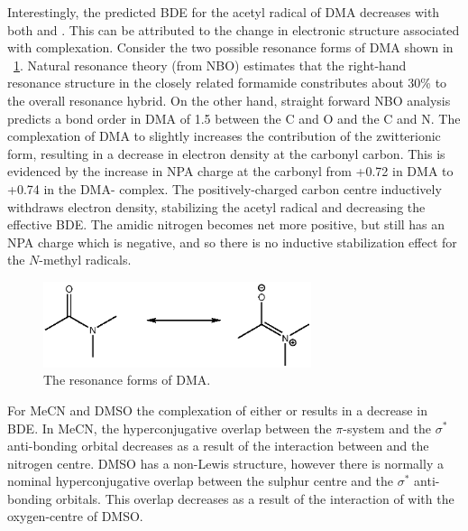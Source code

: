 Interestingly, the predicted BDE for the acetyl radical of DMA decreases with
both  and . This can be attributed to the change in
electronic structure associated with complexation. Consider the two possible
resonance forms of DMA shown in ~\ref{fig:dma-res}. Natural resonance theory
(from NBO) estimates that the right-hand resonance structure in the closely
related formamide constributes about 30\% to the overall resonance
hybrid.\cite{Hrabal1997} On the other hand, straight forward NBO analysis
predicts a bond order in DMA of 1.5 between the C and O and the C and N. The
complexation of DMA to  slightly increases the contribution of the
zwitterionic form, resulting in a decrease in electron density at the carbonyl
carbon. This is evidenced by the increase in NPA charge at the carbonyl from
+0.72 in DMA to +0.74 in the DMA- complex. The positively-charged
carbon centre inductively withdraws electron density, stabilizing the acetyl
radical and decreasing the effective BDE. The amidic nitrogen becomes net more
positive, but still has an NPA charge which is negative, and so there is no
inductive stabilization effect for the $N$-methyl radicals.

\begin{figure}[!htpb]
  \centering
  \includegraphics[width=0.7\textwidth]{figures/DMA-resonance.eps}
  \caption{The resonance forms of DMA.}
  \label{fig:dma-res}
\end{figure}

For MeCN and DMSO the complexation of either  or  results in
a decrease in  BDE. In MeCN, the hyperconjugative overlap between the
 $\pi$-system and the  $\sigma^*$ anti-bonding orbital
decreases as a result of the interaction between  and the nitrogen
centre. DMSO has a non-Lewis structure, however there is normally a nominal
hyperconjugative overlap between the sulphur centre and the  $\sigma^*$
anti-bonding orbitals. This overlap decreases as a result of the interaction of
 with the oxygen-centre of DMSO.

